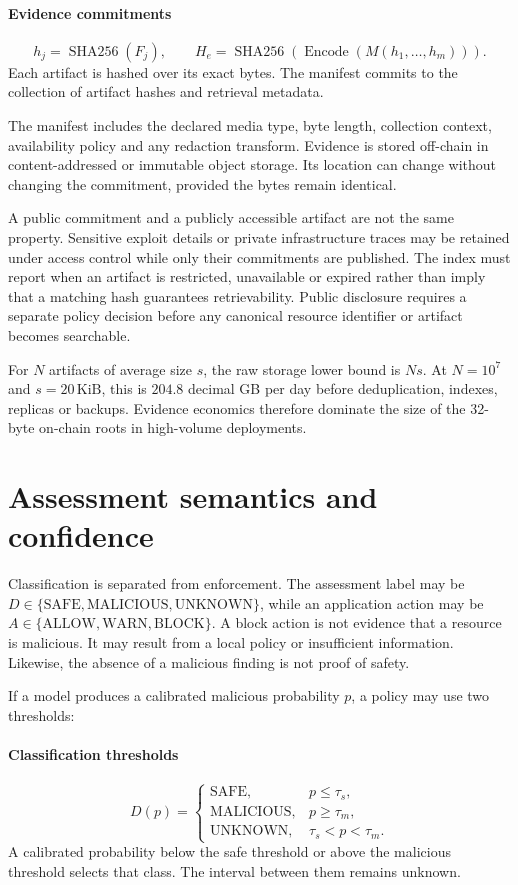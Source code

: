 \documentclass[10pt,a4paper]{article}
\begin{document}
\paragraph{Evidence commitments}
\[h_j=\operatorname{SHA256}(F_j),\qquad H_e=\operatorname{SHA256}(\operatorname{Encode}(M(h_1,\ldots,h_m))).\]
Each artifact is hashed over its exact bytes. The manifest commits to the collection of artifact hashes and retrieval metadata.


The manifest includes the declared media type, byte length, collection context, availability policy and any redaction transform. Evidence is stored off-chain in content-addressed or immutable object storage. Its location can change without changing the commitment, provided the bytes remain identical.


A public commitment and a publicly accessible artifact are not the same property. Sensitive exploit details or private infrastructure traces may be retained under access control while only their commitments are published. The index must report when an artifact is restricted, unavailable or expired rather than imply that a matching hash guarantees retrievability. Public disclosure requires a separate policy decision before any canonical resource identifier or artifact becomes searchable.


For \(N\) artifacts of average size \(s\), the raw storage lower bound is \(Ns\). At \(N=10^7\) and \(s=20\,\mathrm{KiB}\), this is \(204.8\) decimal GB per day before deduplication, indexes, replicas or backups. Evidence economics therefore dominate the size of the 32-byte on-chain roots in high-volume deployments.


\section*{Assessment semantics and confidence}
Classification is separated from enforcement. The assessment label may be \(D\in\{\mathrm{SAFE},\mathrm{MALICIOUS},\mathrm{UNKNOWN}\}\), while an application action may be \(A\in\{\mathrm{ALLOW},\mathrm{WARN},\mathrm{BLOCK}\}\). A block action is not evidence that a resource is malicious. It may result from a local policy or insufficient information. Likewise, the absence of a malicious finding is not proof of safety.


If a model produces a calibrated malicious probability \(p\), a policy may use two thresholds:


\paragraph{Classification thresholds}
\[D(p)=\begin{cases}\mathrm{SAFE},&p\leq\tau_s,\\\mathrm{MALICIOUS},&p\geq\tau_m,\\\mathrm{UNKNOWN},&\tau_s<p<\tau_m.\end{cases}\]
A calibrated probability below the safe threshold or above the malicious threshold selects that class. The interval between them remains unknown.
\end{document}
